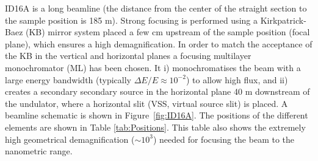\documentclass{iucr}              %
\begin{document}


\begin{table}\label{tab:Undulators}
\centering
\caption{Parameters of the undulators available at the ID16A beamline: period ($\lambda_u$), length ($L$), number of identical undulators ($N$) and deflection parameter ($K$) values for the three main photon energies in use. The valuse are shown for the two ESRF magnetic lattices: the old one (labelled ESRF, with $E_e = 6.04$ GeV) and the new one (EBS, with $E_e = 6.00$ GeV). $n$ is the emission harmonic in use for each particular photon energy.}

\end{table}

ID16A is a long beamline (the distance from the center of the straight section to the sample position is 185 m). Strong focusing is performed using a Kirkpatrick-Baez (KB) mirror system placed a few cm upstream of the sample position (focal plane), which ensures a high demagnification. In order to match the acceptance of the KB in the vertical and horizontal planes a focusing multilayer monochromator (ML) has
been chosen. It i) monochromatises the beam with a large energy bandwidth (typically $\Delta E/E \approx 10^{-2}$) to allow high flux, 
and ii) creates a secondary secondary source in the horizontal plane 40 m downstream of the undulator, where a horizontal slit (VSS, virtual source slit) is placed. A beamline schematic is shown in Figure~\ref{fig:ID16A}. The positions of the different elements are shown in Table \ref{tab:Positions}. This table also shows the extremely high geometrical demagnification ($\sim 10^3$) needed for focusing the beam to the nanometric range.  
\end{document}
